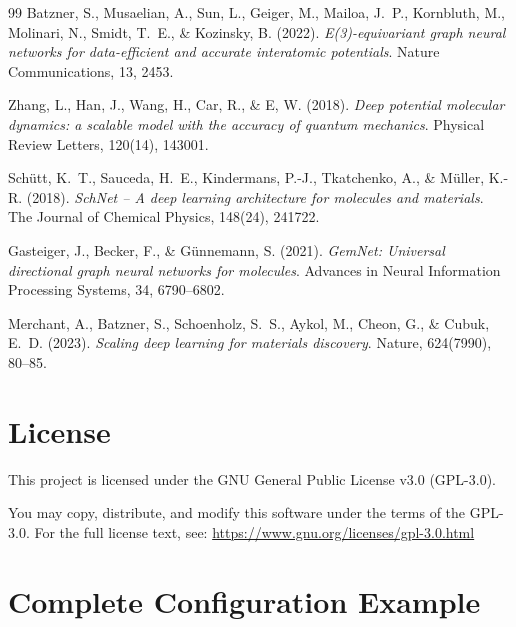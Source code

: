 \documentclass[11pt,a4paper]{article}
\begin{document}
\begin{thebibliography}{99}
Batzner, S., Musaelian, A., Sun, L., Geiger, M., Mailoa, J.~P., Kornbluth, M., Molinari, N., Smidt, T.~E., \& Kozinsky, B. (2022).
\textit{E(3)-equivariant graph neural networks for data-efficient and accurate interatomic potentials}.
Nature Communications, 13, 2453.

Zhang, L., Han, J., Wang, H., Car, R., \& E, W. (2018).
\textit{Deep potential molecular dynamics: a scalable model with the accuracy of quantum mechanics}.
Physical Review Letters, 120(14), 143001.

Sch{\"u}tt, K.~T., Sauceda, H.~E., Kindermans, P.-J., Tkatchenko, A., \& M{\"u}ller, K.-R. (2018).
\textit{SchNet -- A deep learning architecture for molecules and materials}.
The Journal of Chemical Physics, 148(24), 241722.

Gasteiger, J., Becker, F., \& G{\"u}nnemann, S. (2021).
\textit{GemNet: Universal directional graph neural networks for molecules}.
Advances in Neural Information Processing Systems, 34, 6790--6802.

Merchant, A., Batzner, S., Schoenholz, S.~S., Aykol, M., Cheon, G., \& Cubuk, E.~D. (2023).
\textit{Scaling deep learning for materials discovery}.
Nature, 624(7990), 80--85.

\end{thebibliography}

\section{License}

This project is licensed under the GNU General Public License v3.0 (GPL-3.0).

You may copy, distribute, and modify this software under the terms of the GPL-3.0.
For the full license text, see: \url{https://www.gnu.org/licenses/gpl-3.0.html}

\appendix
\section{Complete Configuration Example}
\end{document}
